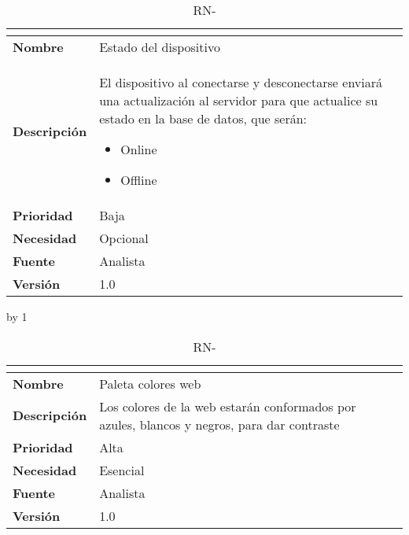\begin{table}[H]
	\caption{RN-\number\rn}
	\begin{tabular}{|l|p{}|}
		\hline
		\multicolumn{2}{|c|}{\cellcolor[HTML]{BFBFBF}{\color[HTML]{000000} \textbf{RN-\number\rn}}} \\ \hline
		\textbf{Nombre}      & Estado del dispositivo                                                                                                                          \\ \hline
		\textbf{Descripción} & El dispositivo al conectarse y desconectarse enviará una actualización al servidor para que actualice su estado en la base de datos, que serán:
		\begin{itemize}
			\item Online
			\item Offline
		\end{itemize} \\ \hline
		\textbf{Prioridad}   & Baja                                                                                                                                            \\ \hline
		\textbf{Necesidad}   & Opcional                                                                                                                                        \\ \hline
		\textbf{Fuente}      & Analista                                                                                                                                        \\ \hline
		\textbf{Versión}     & 1.0                                                                                                                                             \\ \hline
	\end{tabular}
\end{table}
\advance\rn by 1
\begin{table}[H]
	\caption{RN-\number\rn}
	\begin{tabular}{|l|p{}|}
		\hline
		\multicolumn{2}{|c|}{\cellcolor[HTML]{BFBFBF}{\color[HTML]{000000} \textbf{RN-\number\rn}}} \\ \hline
		\textbf{Nombre}      & Paleta colores web                                                                         \\ \hline
		\textbf{Descripción} & Los colores de la web estarán conformados por azules, blancos y negros, para dar contraste \\ \hline
		\textbf{Prioridad}   & Alta                                                                                       \\ \hline
		\textbf{Necesidad}   & Esencial                                                                                   \\ \hline
		\textbf{Fuente}      & Analista                                                                                   \\ \hline
		\textbf{Versión}     & 1.0                                                                                        \\ \hline
	\end{tabular}
\end{table}
